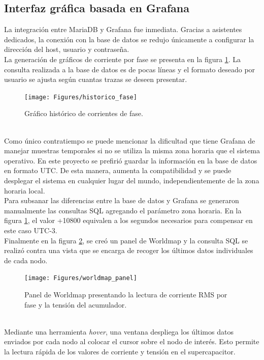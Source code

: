 \subsection{Interfaz gráfica basada en Grafana}
La integración entre MariaDB y Grafana fue inmediata. Gracias a asistentes dedicados, la conexión con la base de datos se redujo únicamente a configurar la dirección del host, usuario y contraseña.\\
La generación de gráficos de corriente por fase se presenta en la figura \ref{fig:historicofase}. La consulta realizada a la base de datos es de pocas líneas y el formato deseado por usuario se ajusta seg\'{u}n cuantas trazas se deseen presentar.\\
\begin{figure}[h]
	\centering
	\texttt{[image: Figures/historico\_fase]}
	\caption{Gráfico histórico de corrientes de fase.}
	\label{fig:historicofase}
\end{figure}\\
Como único contratiempo se puede mencionar la dificultad que tiene Grafana de manejar muestras temporales si no se utiliza la misma zona horaria que el sistema operativo. En este proyecto se prefirió guardar la información en la base de datos en formato UTC. De esta manera, aumenta la compatibilidad y se puede desplegar el sistema en cualquier lugar del mundo, independientemente de la zona horaria local.\\
Para subsanar las diferencias entre la base de datos y Grafana se generaron manualmente las consultas SQL agregando el parámetro zona horaria. En la figura \ref{fig:historicofase}, el valor +10800 equivalen a los segundos necesarios para compensar en este caso UTC-3.\\
Finalmente en la figura \ref{fig:worldmappanel}, se creó un panel de Worldmap y la consulta SQL se realizó contra una vista que se encarga de recoger los últimos datos individuales de cada nodo.\\
\begin{figure}[h]
	\centering
	\texttt{[image: Figures/worldmap\_panel]}
	\caption{Panel de Worldmap presentando la lectura de corriente RMS por fase y la tensión del acumulador.}
	\label{fig:worldmappanel}
\end{figure}\\
Mediante una herramienta \textit{hover}, una ventana despliega los últimos datos enviados por cada nodo al colocar el cursor sobre el nodo de interés. Esto permite la lectura rápida de los valores de corriente y tensión en el supercapacitor.